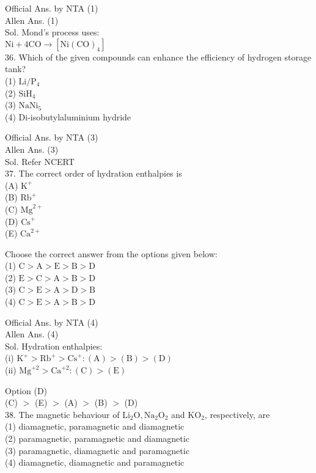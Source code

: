 \documentclass[10pt]{article}
\begin{document}
Official Ans. by NTA (1)\\
Allen Ans. (1)\\
Sol. Mond's process uses:\\
\(\mathrm{Ni}+4 \mathrm{CO} \rightarrow\left[\mathrm{Ni}(\mathrm{CO})_{4}\right]\)\\
36. Which of the given compounds can enhance the efficiency of hydrogen storage tank?\\
(1) \(\mathrm{Li} / \mathrm{P}_{4}\)\\
(2) \(\mathrm{SiH}_{4}\)\\
(3) \(\mathrm{NaNi}_{5}\)\\
(4) Di-isobutylaluminium hydride

Official Ans. by NTA (3)\\
Allen Ans. (3)\\
Sol. Refer NCERT\\
37. The correct order of hydration enthalpies is\\
(A) \(\mathrm{K}^{+}\)\\
(B) \(\mathrm{Rb}^{+}\)\\
(C) \(\mathrm{Mg}^{2+}\)\\
(D) \(\mathrm{Cs}^{+}\)\\
(E) \(\mathrm{Ca}^{2+}\)

Choose the correct answer from the options given below:\\
(1) \(\mathrm{C}>\mathrm{A}>\mathrm{E}>\mathrm{B}>\mathrm{D}\)\\
(2) \(\mathrm{E}>\mathrm{C}>\mathrm{A}>\mathrm{B}>\mathrm{D}\)\\
(3) \(\mathrm{C}>\mathrm{E}>\mathrm{A}>\mathrm{D}>\mathrm{B}\)\\
(4) \(\mathrm{C}>\mathrm{E}>\mathrm{A}>\mathrm{B}>\mathrm{D}\)

Official Ans. by NTA (4)\\
Allen Ans. (4)\\
Sol. Hydration enthalpies:\\
(i) \(\mathrm{K}^{+}>\mathrm{Rb}^{+}>\mathrm{Cs}^{+}:(\mathrm{A})>(\mathrm{B})>(\mathrm{D})\)\\
(ii) \(\mathrm{Mg}^{+2}>\mathrm{Ca}^{+2}:(\mathrm{C})>(\mathrm{E})\)

Option (D)\\
(C) \(>\) (E) \(>\) (A) \(>\) (B) \(>\) (D)\\
38. The magnetic behaviour of \(\mathrm{Li}_{2} \mathrm{O}, \mathrm{Na}_{2} \mathrm{O}_{2}\) and \(\mathrm{KO}_{2}\), respectively, are\\
(1) diamagnetic, paramagnetic and diamagnetic\\
(2) paramagnetic, paramagnetic and diamagnetic\\
(3) paramagnetic, diamagnetic and paramagnetic\\
(4) diamagnetic, diamagnetic and paramagnetic
\end{document}
